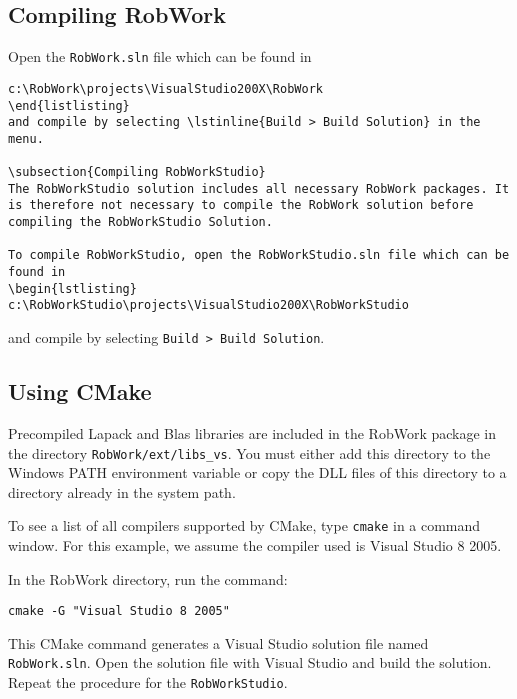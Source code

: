 \subsection{Compiling RobWork}
Open the \lstinline{RobWork.sln} file which can be found in
\begin{lstlisting}
c:\RobWork\projects\VisualStudio200X\RobWork
\end{listlisting}
and compile by selecting \lstinline{Build > Build Solution} in the menu.

\subsection{Compiling RobWorkStudio}
The RobWorkStudio solution includes all necessary RobWork packages. It is therefore not necessary to compile the RobWork solution before compiling the RobWorkStudio Solution.

To compile RobWorkStudio, open the RobWorkStudio.sln file which can be found in
\begin{lstlisting}
c:\RobWorkStudio\projects\VisualStudio200X\RobWorkStudio
\end{lstlisting}
and compile by selecting \lstinline{Build > Build Solution}.


\subsection{Using CMake}

Precompiled Lapack and Blas libraries are included in the RobWork
package in the directory \lstinline{RobWork/ext/libs_vs}. You must either add
this directory to the Windows PATH environment variable or copy the
DLL files of this directory to a directory already in the system path.

To see a list of all compilers supported by CMake, type \lstinline{cmake} in a
command window. For this example, we assume the compiler used is Visual
Studio 8 2005.

In the RobWork directory, run the command:
\begin{lstlisting}
cmake -G "Visual Studio 8 2005"
\end{lstlisting}

This CMake command generates a Visual Studio solution file named \lstinline{RobWork.sln}. Open the solution file with Visual Studio and build the
solution. Repeat the procedure for the \lstinline{RobWorkStudio}.
